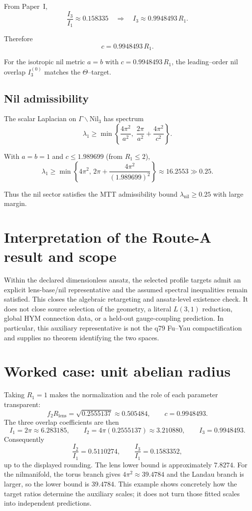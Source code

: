 \documentclass[11pt]{article}
\begin{document}
From Paper~I,
\[
\frac{I_3}{I_1}\approx 0.158335
\quad\Rightarrow\quad
I_3 \approx 0.9948493\,R_1.
\]

Therefore
\[
\boxed{c = 0.9948493\,R_1.}
\]

\begin{proposition}
For the isotropic nil metric $a=b$ with $c=0.9948493\,R_1$,
the leading--order nil overlap $I_3^{(0)}$ matches the $\Theta$--target.
\end{proposition}

\subsection{Nil admissibility}

The scalar Laplacian on $\Gamma\backslash\mathrm{Nil}_3$ has spectrum
\[
\lambda_1 \ge \min\left\{\frac{4\pi^2}{a^2},
\;\frac{2\pi}{a^2}+\frac{4\pi^2}{c^2}\right\}.
\]

With $a=b=1$ and $c\le 1.989699$ (from $R_1\le 2$),
\[
\lambda_1
\ge
\min\left\{4\pi^2,\,
2\pi+\frac{4\pi^2}{(1.989699)^2}\right\}
\approx 16.2553 \gg 0.25.
\]

Thus the nil sector satisfies the MTT admissibility bound
$\lambda_{\mathrm{nil}}\ge 0.25$ with large margin.


\section{Interpretation of the Route-A result and scope}

Within the declared dimensionless ansatz, the selected profile targets admit
an explicit lens-base/nil representative and the assumed spectral inequalities
remain satisfied.  This closes the algebraic retargeting and ansatz-level
existence check.  It does not close source selection of the geometry, a literal
$L(3,1)$ reduction, global HYM connection data, or a held-out gauge-coupling
prediction. In particular, this auxiliary representative is not the q79
Fu--Yau compactification and supplies no theorem identifying the two spaces.

\section{Worked case: unit abelian radius}

Taking $R_1=1$ makes the normalization and the role of each parameter
transparent:
\[
f_2R_{\mathrm{lens}}=\sqrt{0.2555137}\approx0.505484,
\qquad
c=0.9948493.
\]
The three overlap coefficients are then
\[
I_1=2\pi\approx6.283185,\qquad
I_2=4\pi(0.2555137)\approx3.210880,\qquad
I_3=0.9948493.
\]
Consequently
\[
\frac{I_2}{I_1}=0.5110274,
\qquad
\frac{I_3}{I_1}=0.1583352,
\]
up to the displayed rounding. The lens lower bound is approximately $7.8274$.
For the nilmanifold, the torus branch gives $4\pi^2\approx39.4784$ and
the Landau branch is larger, so the lower bound is $39.4784$. This example
shows concretely how the target ratios determine the auxiliary scales; it does
not turn those fitted scales into independent predictions.
\end{document}
